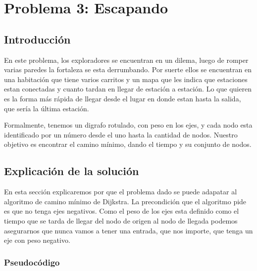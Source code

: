 \documentclass[spanish,12pt]{article}
\begin{document}
\section{Problema 3: Escapando}

\subsection{Introducción}

En este problema, los exploradores se encuentran en un dilema, luego de romper varias paredes la fortaleza se esta derrumbando. Por suerte ellos se encuentran en una habitación que tiene varios carritos y un mapa que les indica que estaciones estan conectadas y cuanto tardan en llegar de estación a estación. Lo que quieren es la forma más rápida de llegar desde el lugar en donde estan hasta la salida, que sería la última estación.

Formalmente, tenemos un digrafo rotulado, con peso en los ejes, y cada nodo esta identificado por un número desde el uno hasta la cantidad de nodos. Nuestro objetivo es encontrar el camino mínimo, dando el tiempo y su conjunto de nodos.


\subsection{Explicación de la solución}

   En esta sección explicaremos por que el problema dado se puede adapatar al algoritmo de camino mínimo de Dijkstra.
 La precondición que el algoritmo pide es que no tenga ejes negativos. Como el peso de los ejes esta definido como el tiempo que se tarda de llegar del nodo de origen al nodo de llegada podemos asegurarnos que nunca vamos a tener una entrada, que nos importe, que tenga un eje con peso negativo. 

\subsubsection{Pseudocódigo}
\end{document}
